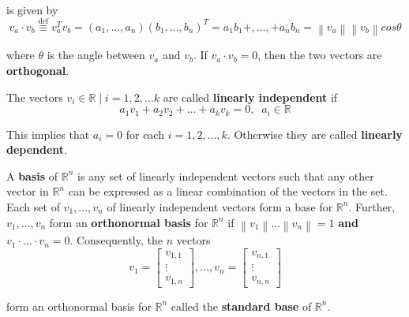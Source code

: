 \documentclass[a4paper,10pt]{article}
\newcommand\norm[1]{\left\lVert#1\right\rVert}
\begin{document}
is given by 
$$v_a \cdot v_b \stackrel{\text{def}}{\equiv} v_a^Tv_b = (a_1, \ldots, a_n) (b_1, \ldots, b_n)^T = a_1 b_1 +, \ldots, + a_n b_n = \norm{v_a}\norm{v_b}cos{\theta}$$

where ${\theta}$ is the angle between $v_a$ and $v_b$. If $v_a \cdot v_b = 0$, then the two vectors are \textbf{orthogonal}.

The vectors ${v_i \in {\mathbb{R}} \; | \; i = 1, 2,\ldots k}$ are called \textbf{linearly independent} if
$$a_1v_1 + a_2v_2 + \ldots + a_kv_k = 0, \; \; a_i \in {\mathbb{R}}$$

This implies that $a_i = 0$ for each $i = 1, 2, \ldots, k$. Otherwise they are called \textbf{linearly dependent}.

A \textbf{basis} of ${\mathbb{R}}^n$ is any set of linearly independent vectors such that any other vector in ${\mathbb{R}}^n$ can be expressed as a linear combination of the vectors in the set. Each set of $v_1, \ldots, v_n$ of linearly independent vectors form a base for ${\mathbb{R}}^n$. Further, $v_1, \ldots, v_n$ form an \textbf{orthonormal basis} for ${\mathbb{R}}^n$ if $\norm{v_1} \ldots \norm{v_n} = 1$ \textbf{and} $v_1 \cdot \ldots \cdot v_n = 0$. 
Consequently, the $n$ vectors
$$v_1 = {\begin{bmatrix}
v_{1,1} \\
\vdots \\
v_{1,n}
\end{bmatrix}}, \ldots, v_n = {\begin{bmatrix}
v_{n,1} \\
\vdots \\
v_{n,n}
\end{bmatrix}}$$

form an orthonormal basis for ${\mathbb{R}}^n$ called the \textbf{standard base} of ${\mathbb{R}}^n$.
\end{document}
